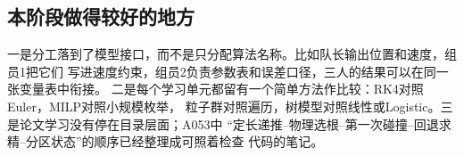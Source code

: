 \subsection{本阶段做得较好的地方}

一是分工落到了模型接口，而不是只分配算法名称。比如队长输出位置和速度，组员1把它们
写进速度约束，组员2负责参数表和误差口径，三人的结果可以在同一张变量表中衔接。
二是每个学习单元都留有一个简单方法作比较：RK4对照Euler，MILP对照小规模枚举，
粒子群对照遍历，树模型对照线性或Logistic。三是论文学习没有停在目录层面；A053中
“定长递推--物理选根--第一次碰撞--回退求精--分区状态”的顺序已经整理成可照着检查
代码的笔记。

